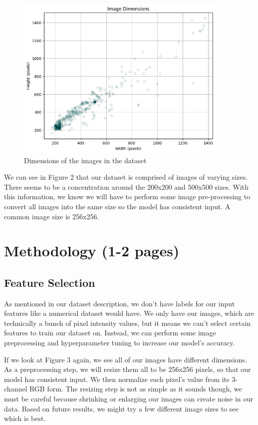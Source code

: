 \documentclass[conference]{IEEEtran}
\begin{document}
\begin{figure}[!ht]
    \centering
    \includegraphics[width=4in]{ImageDimensions.png}
    \caption{\large Dimensions of the images in the dataset}
    \label{Dimensions of images in the dataset}
\end{figure}

We can see in Figure 2 that our dataset is comprised of images of varying sizes. There seems to be a concentration around the 200x200 and 500x500 sizes. With this information, we know we will have to perform some image pre-processing to convert all images into the same size so the model has consistent input. A common image size is 256x256.

\section{\large Methodology (1-2 pages)}

\subsection{\large Feature Selection}
As mentioned in our dataset description, we don't have labels for our input features like a numerical dataset would have. We only have our images, which are technically a bunch of pixel intensity values, but it means we can't select certain features to train our dataset on. Instead, we can perform some image preprocessing and hyperparameter tuning to increase our model's accuracy.

If we look at Figure 3 again, we see all of our images have different dimensions.  As a preprocessing step, we will resize them all to be 256x256 pixels, so that our model has consistent input. We then normalize each pixel's value from its 3-channel RGB form. The resizing step is not as simple as it sounds though, we must be careful because shrinking or enlarging our images can create noise in our data. Based on future results, we might try a few different image sizes to see which is best. 
\end{document}

